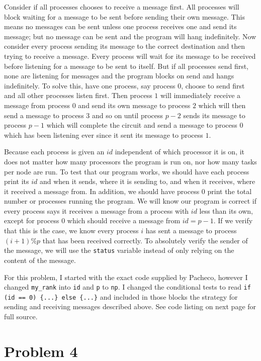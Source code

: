\documentclass[11pt]{article}
\begin{document}
Consider if all processes chooses to receive a message first. All processes will block waiting for a message to be sent before sending their own message. This means no messages can be sent unless one process receives one and send its message; but no message can be sent and the program will hang indefinitely. Now consider every process sending its message to the correct destination and then trying to receive a message. Every process will wait for its message to be received before listening for a message to be sent to itself. But if all processes send first, none are listening for messages and the program blocks on send and hangs indefinitely. To solve this, have one process, say process $0$, choose to send first and all other processes listen first. Then process $1$ will immediately receive a message from process $0$ and send its own message to process $2$ which will then send a message to process $3$ and so on until process $p-2$ sends its message to process $p-1$ which will complete the circuit and send a message to process $0$ which has been listening ever since it sent its message to process $1$.

Because each process is given an $id$ independent of which processor it is on, it does not matter how many processors the program is run on, nor how many tasks per node are run. To test that our program works, we should have each process print its $id$ and when it sends, where it is sending to, and when it receives, where it received a message from. In addition, we should have process $0$ print the total number or processes running the program. We will know our program is correct if every process says it receives a message from a process with $id$ less than its own, except for process $0$ which should receive a message from $id=p-1$. If we verify that this is the case, we know every process $i$ has sent a message to process $(i+1)\%p$ that has been received correctly. To absolutely verify the sender of the message, we will use the \texttt{status} variable instead of only relying on the content of the message.

For this problem, I started with the exact code supplied by Pacheco, however I changed \texttt{my\_rank} into \texttt{id} and \texttt{p} to \texttt{np}. I changed the conditional tests to read \texttt{if (id == 0) \{...\} else \{...\}} and included in those blocks the strategy for sending and receiving messages described above. See code listing on next page for full source.
\pagebreak

\pagebreak

\section{Problem 4}
\end{document}
